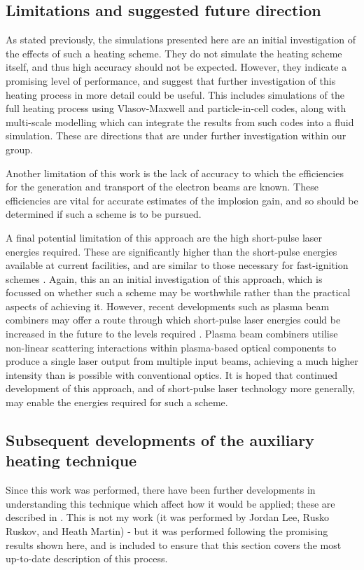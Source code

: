 \subsection{Limitations and suggested future direction}

As stated previously, the simulations presented here are an initial investigation of the effects of such a heating scheme. They do not simulate the heating scheme itself, and thus high accuracy should not be expected. However, they indicate a promising level of performance, and suggest that further investigation of this heating process in more detail could be useful. This includes simulations of the full heating process using Vlasov-Maxwell and particle-in-cell codes, along with multi-scale modelling which can integrate the results from such codes into a fluid simulation. These are directions that are under further investigation within our group.

Another limitation of this work is the lack of accuracy to which the efficiencies for the generation and transport of the electron beams are known. These efficiencies are vital for accurate estimates of the implosion gain, and so should be determined if such a scheme is to be pursued.

A final potential limitation of this approach are the high short-pulse laser energies required. These are significantly higher than the short-pulse energies available at current facilities, and are similar to those necessary for fast-ignition schemes \cite{Strozzi2012}. Again, this an an initial investigation of this approach, which is focussed on whether such a scheme may be worthwhile rather than the practical aspects of achieving it. However, recent developments such as plasma beam combiners \cite{Kirkwood2018,Kirkwood2018a} may offer a route through which short-pulse laser energies could be increased in the future to the levels required \cite{KirkwoodPersonalComm}. Plasma beam combiners utilise non-linear scattering interactions within plasma-based optical components to produce a single laser output from multiple input beams, achieving a much higher intensity than is possible with conventional optics. It is hoped that continued development of this approach, and of short-pulse laser technology more generally, may enable the energies required for such a scheme.

\subsection{Subsequent developments of the auxiliary heating technique} \label{sec:AuxHeatingDevlopments}
Since this work was performed, there have been further developments in understanding this technique which affect how it would be applied; these are described in \cite{Lee2023}. This is not my work (it was performed by Jordan Lee, Rusko Ruskov, and Heath Martin) - but it was performed following the promising results shown here, and is included to ensure that this section covers the most up-to-date description of this process.

